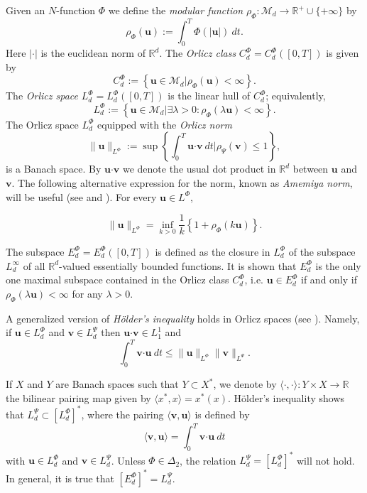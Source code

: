 \documentclass[twoside]{article}
\theoremstyle{remark}
\newcommand{\orlnor}{\|_{L^{\Phi}}}
\newcommand{\lphi}{L^{\Phi}}
\newcommand{\lpsi}{L^{\Psi}}
\newcommand{\ephi}{E^{\Phi}}
\newcommand{\claseor}{C^{\Phi}}
\renewcommand{\b}[1]{\boldsymbol{#1}}
\newcommand{\ccdot}{\b{\cdot}}
\renewcommand{\leq}{\leqslant}
\begin{document}
Given  an $N$-function $\Phi$ we define the \emph{modular function} 
$\rho_{\Phi}:\mathcal{M}_d\to \mathbb{R}^+\cup\{+\infty\}$ by
\[\rho_{\Phi}(\b{u}):= \int_0^T \Phi(|\b{u}|)\ dt.\]
Here $|\cdot|$ is the euclidean norm of $\mathbb{R}^d$.
The \emph{Orlicz class} $C_d^{\Phi}=C_d^{\Phi}([0,T])$  is given  by
\begin{equation}\label{claseOrlicz}
  C^{\Phi}_d:=\left\{\b{u}\in \mathcal{M}_d | \rho_{\Phi}(\b{u})< \infty \right\}.
\end{equation}
The \emph{Orlicz space} $\lphi_d=L^{\Phi}_d([0,T])$ is the linear hull of $\claseor_d$;
equivalently,
\begin{equation}\label{espacioOrlicz}
\lphi_d:=\left\{ \b{u}\in \mathcal{M}_d | \exists \lambda>0: \rho_{\Phi}(\lambda \b{u}) < \infty   \right\}.
\end{equation}
  The Orlicz space $\lphi_d$ equipped with the \emph{Orlicz norm}
\[
\|  \b{u}  \orlnor:=\sup \left\{  \int_0^T \b{u}\b{\cdot} \b{v}\ dt \big| \rho_{\Psi}(\b{v})\leq 1\right\},
\]
is a Banach space. By $\b{u}\b{\cdot} \b{v}$ we denote the usual dot product in $\mathbb{R}^{d}$ between $\b{u}$ and $\b{v}$.  
The following alternative expression for the norm, known as \emph{Amemiya norm},     will  be useful (see \cite[Thm. 10.5]{KR} and \cite{hudzik2000amemiya}). For every $\b{u}\in\lphi$,

\begin{equation}\label{amemiya}
\|\b{u}\orlnor=\inf\limits_{k>0}\frac{1}{k}\left\{1+\rho_{\Phi}(k\b{u})\right\}.
\end{equation}



The subspace $\ephi_d=\ephi_d([0,T])$ is defined as the closure in $\lphi_d$ of the subspace $L^{\infty}_d$ of all $\mathbb{R}^d$-valued essentially bounded functions. It is shown that  $\ephi_d$ is the only one maximal subspace contained in the Orlicz class $\claseor_d$, i.e. 
$\b{u}\in\ephi_d$ if and only if $\rho_{\Phi}(\lambda \b{u})<\infty$ for any $\lambda>0$.  

A generalized version of \emph{H\"older's inequality} holds in Orlicz spaces (see \cite[Th. 9.3]{KR}). Namely, if $\b{u}\in\lphi_d$ and $\b{v}\in\lpsi_d$ then $\b{u}\ccdot\b{v}\in L_1^1$ and
\begin{equation}\label{holder}
\int_0^T\b{v}\ccdot\b{u}\ dt\leq \|\b{u}\orlnor\|\b{v}\|_{L^{\Psi}}.
\end{equation}




If $X$ and $Y$ are  Banach spaces such that  $Y\subset X^*$, we denote by $\langle\cdot,\cdot\rangle:Y\times X\to\mathbb{R}$ the bilinear pairing  map given by $\langle x^*,x\rangle=x^*(x)$. H\"older's inequality shows that $\lpsi_d\subset \left[\lphi_d\right]^*$, where the pairing  
$\langle \b{v}, \b{u}\rangle$
is defined by 
\begin{equation}\label{pairing}
  \langle \b{v},\b{u}\rangle=\int_0^T\b{v}\ccdot\b{u}\ dt
\end{equation}
with  $\b{u}\in\lphi_d$ and $\b{v}\in\lpsi_d$.
 Unless $\Phi \in \Delta_2$, the relation $\lpsi_d= \left[\lphi_d\right]^*$ will not hold. In general, it is true  that  $\left[\ephi_d\right]^*=\lpsi_d$.
\end{document}
